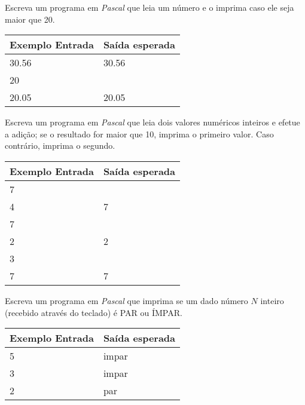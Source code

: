 
\item Escreva um programa em \emph{Pascal} que leia um número e o imprima 
caso ele seja maior que 20.

\begin{center}
\begin{tabular}{|l|l|} \hline
Exemplo Entrada & Saída esperada \\ \hline
30.56           & 30.56          \\ \hline
20              &                \\ \hline
20.05           & 20.05          \\ \hline
\end{tabular}
\end{center}

\item Escreva um programa em \emph{Pascal} que leia dois valores numéricos 
inteiros e efetue a adição; se o resultado for maior que 10, imprima o 
primeiro valor. Caso contrário, imprima o segundo.

\begin{center}
\begin{tabular}{|l|l|} \hline
Exemplo Entrada & Saída esperada \\ \hline
7                &                \\
4                &   7             \\ \hline
7                &                \\
2                &   2             \\ \hline
3                &                \\
7                &   7             \\ \hline
\end{tabular}
\end{center}

\item Escreva um programa em \emph{Pascal} que imprima se um dado número $N$ 
inteiro (recebido através do teclado) é PAR ou ÍMPAR.

\begin{center}
\begin{tabular}{|l|l|} \hline
Exemplo Entrada & Saída esperada \\ \hline
5                & impar               \\ \hline
3                & impar               \\ \hline
2                & par               \\ \hline
\end{tabular}
\end{center}

